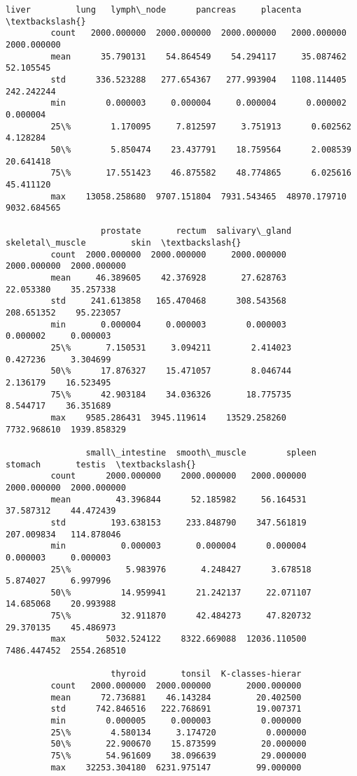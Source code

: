 \documentclass[11pt]{article}
\begin{document}
\begin{Verbatim}[commandchars=\\\{\}]
                       liver         lung   lymph\_node      pancreas     placenta  \textbackslash{}
         count   2000.000000  2000.000000  2000.000000   2000.000000  2000.000000   
         mean      35.790131    54.864549    54.294117     35.087462    52.105545   
         std      336.523288   277.654367   277.993904   1108.114405   242.242244   
         min        0.000003     0.000004     0.000004      0.000002     0.000004   
         25\%        1.170095     7.812597     3.751913      0.602562     4.128284   
         50\%        5.850474    23.437791    18.759564      2.008539    20.641418   
         75\%       17.551423    46.875582    48.774865      6.025616    45.411120   
         max    13058.258680  9707.151804  7931.543465  48970.179710  9032.684565   
         
                   prostate       rectum  salivary\_gland  skeletal\_muscle         skin  \textbackslash{}
         count  2000.000000  2000.000000     2000.000000      2000.000000  2000.000000   
         mean     46.389605    42.376928       27.628763        22.053380    35.257338   
         std     241.613858   165.470468      308.543568       208.651352    95.223057   
         min       0.000004     0.000003        0.000003         0.000002     0.000003   
         25\%       7.150531     3.094211        2.414023         0.427236     3.304699   
         50\%      17.876327    15.471057        8.046744         2.136179    16.523495   
         75\%      42.903184    34.036326       18.775735         8.544717    36.351689   
         max    9585.286431  3945.119614    13529.258260      7732.968610  1939.858329   
         
                small\_intestine  smooth\_muscle        spleen      stomach       testis  \textbackslash{}
         count      2000.000000    2000.000000   2000.000000  2000.000000  2000.000000   
         mean         43.396844      52.185982     56.164531    37.587312    44.472439   
         std         193.638153     233.848790    347.561819   207.009834   114.878046   
         min           0.000003       0.000004      0.000004     0.000003     0.000003   
         25\%           5.983976       4.248427      3.678518     5.874027     6.997996   
         50\%          14.959941      21.242137     22.071107    14.685068    20.993988   
         75\%          32.911870      42.484273     47.820732    29.370135    45.486973   
         max        5032.524122    8322.669088  12036.110500  7486.447452  2554.268510   
         
                     thyroid       tonsil  K-classes-hierar  
         count   2000.000000  2000.000000       2000.000000  
         mean      72.736881    46.143284         20.402500  
         std      742.846516   222.768691         19.007371  
         min        0.000005     0.000003          0.000000  
         25\%        4.580134     3.174720          0.000000  
         50\%       22.900670    15.873599         20.000000  
         75\%       54.961609    38.096639         29.000000  
         max    32253.304180  6231.975147         99.000000  
\end{Verbatim}
            
\end{document}
